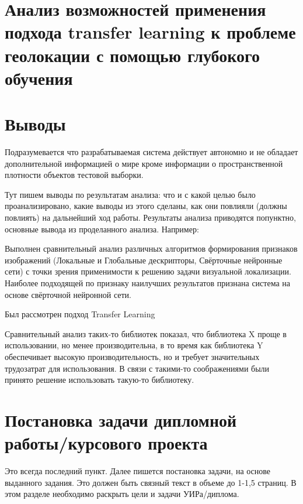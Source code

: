 \section{Анализ возможностей применения подхода transfer learning к проблеме геолокации с помощью глубокого обучения}



\section{Выводы}

Подразумевается что разрабатываемая система действует автономно и не обладает дополнительной информацией о мире кроме информации о пространственной плотности объектов тестовой выборки.

Тут пишем выводы по результатам анализа: что и с какой целью было проанализировано, какие выводы из этого сделаны, как они повлияли (должны повлиять) на дальнейший ход работы. Результаты анализа приводятся попунктно, основные вывода из проделанного анализа. Например:

\begin{compactenum}
	\item Выполнен сравнительный анализ различных алгоритмов формирования признаков изображений (Локальные и Глобальные дескрипторы, Свёрточные нейронные сети) с точки зрения применимости к решению задачи визуальной локализации. Наиболее подходящей по признаку наилучших результатов признана система на основе свёрточной нейронной сети.
	\item Был рассмотрен подход Transfer Learning 
	\item Сравнительный анализ таких-то библиотек показал, что библиотека X проще в использовании, но менее производительна, в то время как библиотека Y обеспечивает высокую производительность, но и требует значительных трудозатрат для использования. В связи с такими-то соображениями были принято решение использовать такую-то библиотеку.
\end{compactenum}



\section{Постановка задачи дипломной работы/курсового проекта}

Это всегда последний пункт. Далее пишется постановка задачи, на основе выданного задания. Это должен быть связный текст в объеме до 1-1,5 страниц. В этом разделе необходимо раскрыть цели и задачи УИРа/диплома. 

